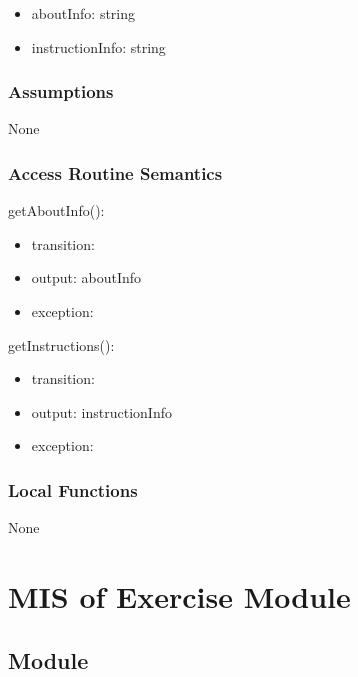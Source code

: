 \documentclass[12pt, titlepage]{article}
\begin{document}
\begin{itemize}
    \item aboutInfo: string
    \item instructionInfo: string
\end{itemize}

\subsubsection{Assumptions}

None

\subsubsection{Access Routine Semantics}

\noindent getAboutInfo():
\begin{itemize}
\item transition: 
\item output: aboutInfo
\item exception: 
\end{itemize}

\noindent getInstructions():
\begin{itemize}
\item transition:
\item output: instructionInfo
\item exception: 
\end{itemize}


\subsubsection{Local Functions}

None


\newpage


\section{MIS of Exercise Module} \label{Exercise} 

\subsection{Module}
\end{document}
